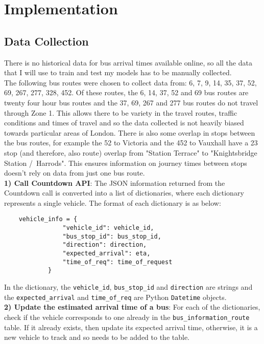\section{Implementation}

\subsection{Data Collection}

There is no historical data for bus arrival times available online, so all the data that I will use to train and test my models has to be manually collected. \\

The following bus routes were chosen to collect data from: 6, 7, 9, 14, 35, 37, 52, 69, 267, 277, 328, 452. Of these routes, the 6, 14, 37, 52 and 69 bus routes are twenty four hour bus routes and the 37, 69, 267 and 277 bus routes do not travel through Zone 1. This allows there to be variety in the travel routes, traffic conditions and times of travel and so the data collected is not heavily biased towards particular areas of London. There is also some overlap in stops between the bus routes, for example the 52 to Victoria and the 452 to Vauxhall have a 23 stop (and therefore, also route) overlap from "Station Terrace" to  "Knightsbridge Station /\ Harrods". This ensures information on journey times between stops doesn't rely on data from just one bus route. \\

\textbf{1) Call Countdown API}: The JSON information returned from the Countdown call is converted into a list of dictionaries, where each dictionary represents a single vehicle. The format of each dictionary is as below:

\begin{lstlisting}
    vehicle_info = {
                "vehicle_id": vehicle_id,
                "bus_stop_id": bus_stop_id,
                "direction": direction,
                "expected_arrival": eta,
                "time_of_req": time_of_request
            }
\end{lstlisting}

In the dictionary, the \texttt{vehicle\_id}, \texttt{bus\_stop\_id} and \texttt{direction} are strings and the \texttt{expected\_arrival} and \texttt{time\_of\_req} are Python \texttt{Datetime} objects. \\

\textbf{2) Update the estimated arrival time of a bus}: For each of the dictionaries, check if the vehicle corresponds to one already in the \texttt{bus\_information\_route} table. If it already exists, then update its expected arrival time, otherwise, it is a new vehicle to track and so needs to be added to the table. \\

